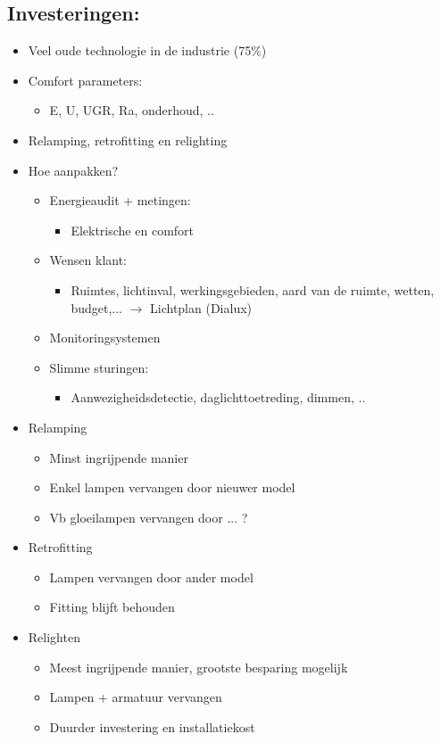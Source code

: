 \documentclass[12pt]{article}
\begin{document}
\subsection{Investeringen:}\begin{itemize}
    \item Veel oude technologie in de industrie (75\%)
    \item Comfort parameters:\begin{itemize}
        \item E, U, UGR, Ra, onderhoud, ..
    \end{itemize}
    \item Relamping, retrofitting en relighting
    \item Hoe aanpakken?\begin{itemize}
        \item Energieaudit + metingen:\begin{itemize}
            \item Elektrische en comfort
        \end{itemize}
        \item Wensen klant:\begin{itemize}
            \item Ruimtes, lichtinval, werkingsgebieden, aard van de ruimte, wetten, budget,... $\rightarrow$ Lichtplan (Dialux)
        \end{itemize}
    \item Monitoringsystemen
    \item Slimme sturingen:\begin{itemize}
        \item Aanwezigheidsdetectie, daglichttoetreding, dimmen, ..
    \end{itemize}
    \end{itemize}
\end{itemize}
\begin{itemize}
    \item Relamping\begin{itemize}
        \item Minst ingrijpende manier
        \item Enkel lampen vervangen door nieuwer model
        \item Vb gloeilampen vervangen door ... ?
    \end{itemize}
    \item Retrofitting\begin{itemize}
        \item Lampen vervangen door ander model
        \item Fitting blijft behouden
    \end{itemize}
    \item Relighten\begin{itemize}
        \item Meest ingrijpende manier, grootste besparing mogelijk
        \item Lampen + armatuur vervangen
        \item Duurder investering en installatiekost
    \end{itemize}
\end{itemize}
\end{document}
